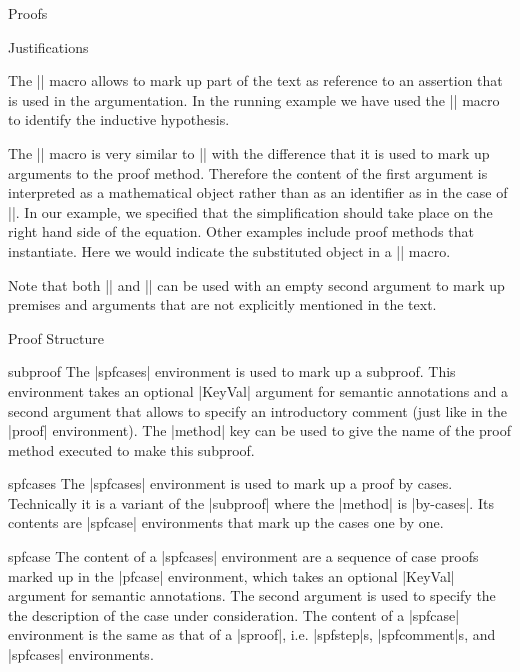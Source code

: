 \begin{sfragment}{Proofs}
\begin{sfragment}{Justifications}
  \begin{function}{\premise}
    The |\premise| macro allows to mark up part of the text as reference to an assertion
    that is used in the argumentation. In the running example we have used the |\premise|
    macro to identify the inductive hypothesis.
  \end{function}
  
  \begin{function}{\justarg}
    The |\justarg| macro is very similar to |\premise| with the difference that it is used
    to mark up arguments to the proof method. Therefore the content of the first argument
    is interpreted as a mathematical object rather than as an identifier as in the case of
    |\premise|. In our example, we specified that the simplification should take place on
    the right hand side of the equation. Other examples include proof methods that
    instantiate. Here we would indicate the substituted object in a |\justarg| macro.
  \end{function}

  Note that both |\premise| and |\justarg| can be used with an empty second argument to
  mark up premises and arguments that are not explicitly mentioned in the text.
\end{sfragment}

\begin{sfragment}{Proof Structure}

  \begin{environment}{subproof}
    The |spfcases| environment is used to mark up a subproof. This environment takes an
    optional |KeyVal| argument for semantic annotations and a second argument that allows
    to specify an introductory comment (just like in the |proof| environment). The
    |method| key can be used to give the name of the proof method
    executed to make this subproof.
  \end{environment}
  
  \begin{environment}{spfcases}
    The |spfcases| environment is used to mark up a proof by cases. Technically it is a
    variant of the |subproof| where the |method| is |by-cases|. Its contents are |spfcase|
    environments that mark up the cases one by one.
  \end{environment}

  \begin{environment}{spfcase}
    The content of a |spfcases| environment are a sequence of case proofs marked up in the
    |pfcase| environment, which takes an optional |KeyVal| argument for semantic
    annotations. The second argument is used to specify the the description of the case
    under consideration. The content of a |spfcase| environment is the same as that of a
    |sproof|, i.e. |spfstep|s, |spfcomment|s, and |spfcases| environments.
  \end{environment}
  

\end{sfragment}
\end{sfragment}
